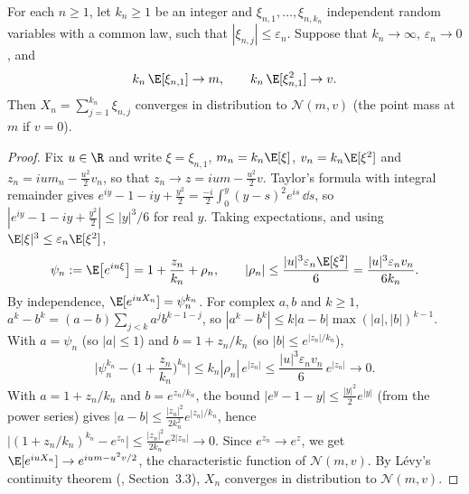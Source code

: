 \begin{lemma}\label{lem:bs-clt}
For each $n\ge1$, let $k_n\ge1$ be an integer and $\xi_{n,1},\dots,\xi_{n,k_n}$ independent
random variables with a common law, such that $|\xi_{n,j}|\le\varepsilon_n$. Suppose that
$k_n\to\infty$, $\varepsilon_n\to0$, and
\[
  k_n\,\E[\xi_{n,1}]\to m,\qquad k_n\,\E[\xi_{n,1}^2]\to v .
\]
Then $X_n=\sum_{j=1}^{k_n}\xi_{n,j}$ converges in distribution to $\mathcal N(m,v)$ (the
point mass at $m$ if $v=0$).
\end{lemma}

\begin{proof}
Fix $u\in\R$ and write $\xi=\xi_{n,1}$, $m_n=k_n\E[\xi]$, $v_n=k_n\E[\xi^2]$ and
$z_n=ium_n-\frac{u^2}2v_n$, so that $z_n\to z=ium-\frac{u^2}2v$. Taylor's formula with
integral remainder gives
$e^{iy}-1-iy+\frac{y^2}2=\frac{-i}{2}\int_0^y(y-s)^2e^{is}\,\dd s$, so
$|e^{iy}-1-iy+\frac{y^2}{2}|\le|y|^3/6$ for real $y$. Taking expectations, and using
$\E|\xi|^3\le\varepsilon_n\E[\xi^2]$,
\[
  \psi_n:=\E\big[e^{iu\xi}\big]=1+\frac{z_n}{k_n}+\rho_n,\qquad
  |\rho_n|\le\frac{|u|^3\varepsilon_n\E[\xi^2]}{6}=\frac{|u|^3\varepsilon_nv_n}{6k_n}.
\]
By independence, $\E[e^{iuX_n}]=\psi_n^{k_n}$. For complex $a,b$ and $k\ge1$,
$a^k-b^k=(a-b)\sum_{j<k}a^jb^{k-1-j}$, so $|a^k-b^k|\le k|a-b|\max(|a|,|b|)^{k-1}$. With
$a=\psi_n$ (so $|a|\le1$) and $b=1+z_n/k_n$ (so $|b|\le e^{|z_n|/k_n}$),
\[
  \Big|\psi_n^{k_n}-\Big(1+\frac{z_n}{k_n}\Big)^{k_n}\Big|\le k_n|\rho_n|\,e^{|z_n|}
  \le\frac{|u|^3\varepsilon_nv_n}{6}\,e^{|z_n|}\longrightarrow0 .
\]
With $a=1+z_n/k_n$ and $b=e^{z_n/k_n}$, the bound $|e^y-1-y|\le\frac{|y|^2}2e^{|y|}$
(from the power series) gives $|a-b|\le\frac{|z_n|^2}{2k_n^2}e^{|z_n|/k_n}$, hence
$\big|(1+z_n/k_n)^{k_n}-e^{z_n}\big|\le\frac{|z_n|^2}{2k_n}e^{2|z_n|}\to0$. Since
$e^{z_n}\to e^z$, we get $\E[e^{iuX_n}]\to e^{ium-u^2v/2}$, the characteristic function of
$\mathcal N(m,v)$. By Lévy's continuity theorem (\textcite{durrett}, Section~3.3), $X_n$
converges in distribution to $\mathcal N(m,v)$.
\end{proof}

